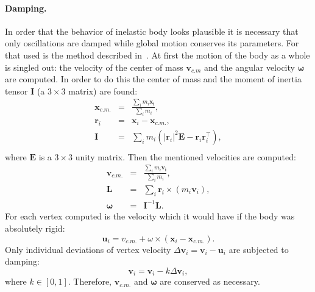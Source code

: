 \documentclass[a4paper, 12pt, titlepage]{extarticle}
\newcommand{\vect}[1]{\mathbf{#1}} %
\newcommand{\matx}[1]{\mathbf{#1}} %
\newcommand{\transposed}{\top} %
\begin{document}
        \paragraph{Damping.}
        In order that the behavior of inelastic body looks plausible it is necessary that only
        oscillations are damped while global motion conserves its parameters. For that used is the
        method described in~\cite[sec.~3.5]{mueller-position-dynamics}. At first the motion of the
        body as a whole is singled out: the velocity of the center of mass $\vect{v}_{c.m}$ and the
        angular velocity $\vect{\omega}$ are computed. In order to do this the center of mass and
        the moment of inertia tensor $\matx I$ (a $3 \times 3$ matrix) are found:
        \begin{eqnarray*}
          \vect{x}_{c.m.} & = & \frac{\sum_i m_i \vect{x_i}}{\sum_i m_i},\\
          \vect{r}_i      & = & \vect{x}_i - \vect{x}_{c.m.},\\
          \matx{I}        & = & \sum_i m_i ( |\vect{r}_i|^2 \matx E - \vect{r}_i \vect{r}_i^\transposed),\\
        \end{eqnarray*}
        where $\matx E$ is a $3 \times 3$ unity matrix. Then the mentioned velocities are computed:
        \begin{eqnarray*}
          \vect{v}_{c.m.} & = & \frac{\sum_i m_i \vect{v_i}}{\sum_i m_i},\\
          \vect{L}        & = & \sum_i \vect{r}_i \times (m_i \vect{v}_i),\\
          \vect{\omega}   & = & \matx{I}^{-1} \vect{L}.
        \end{eqnarray*}
        For each vertex computed is the velocity which it would have if the body was absolutely rigid:
        \begin{equation}\label{eq:rigid_velocity}
          \vect{u}_i = v_{c.m.} + \omega \times (\vect{x}_i - \vect{x}_{c.m.}).
        \end{equation}
        Only individual deviations of vertex velocity $\Delta \vect{v}_i = \vect{v}_i - \vect{u}_i$
        are subjected to damping:
        \begin{equation}\label{eq:damping}
          \vect{v}_i = \vect{v}_i - k \Delta \vect{v}_i,
        \end{equation}
        where $k \in [0, 1]$. Therefore, $\vect{v}_{c.m.}$ and $\vect{\omega}$ are conserved as necessary.
\end{document}
